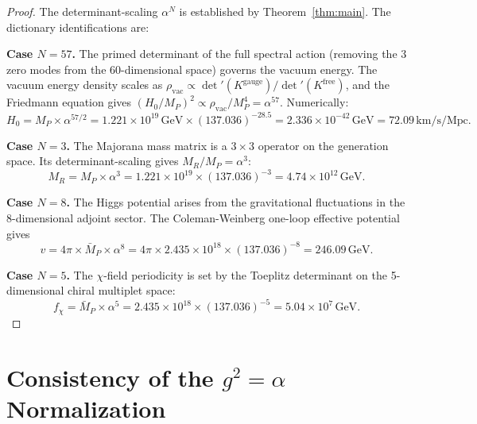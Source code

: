 \documentclass[11pt]{article}
\theoremstyle{definition}
\theoremstyle{remark}
\newcommand{\Mp}{M_P}
\newcommand{\Mpr}{\bar{M}_P}
\begin{document}
\begin{proof}
The determinant-scaling $\alpha^N$ is established by
Theorem~\ref{thm:main}. The dictionary identifications are:

\medskip\noindent
\textbf{Case $N = 57$.} The primed determinant of the full spectral
action (removing the 3 zero modes from the $60$-dimensional space)
governs the vacuum energy. The vacuum energy density scales as
$\rho_{\mathrm{vac}} \propto \det'(K^{\mathrm{gauge}}) /
\det'(K^{\mathrm{free}})$, and the Friedmann equation gives
$(H_0/\Mp)^2 \propto \rho_{\mathrm{vac}}/\Mp^4 = \alpha^{57}$.
Numerically:
\begin{equation}
H_0 = \Mp \times \alpha^{57/2}
= 1.221 \times 10^{19}\,\text{GeV} \times (137.036)^{-28.5}
= 2.336 \times 10^{-42}\,\text{GeV} = 72.09\,\text{km/s/Mpc}.
\end{equation}

\medskip\noindent
\textbf{Case $N = 3$.} The Majorana mass matrix is a $3 \times 3$
operator on the generation space. Its determinant-scaling gives
$M_R / \Mp = \alpha^3$:
\begin{equation}
M_R = \Mp \times \alpha^3 = 1.221 \times 10^{19} \times (137.036)^{-3}
= 4.74 \times 10^{12}\,\text{GeV}.
\end{equation}

\medskip\noindent
\textbf{Case $N = 8$.} The Higgs potential arises from the
gravitational fluctuations in the 8-dimensional adjoint sector.
The Coleman-Weinberg one-loop effective potential gives
\begin{equation}
v = 4\pi \times \Mpr \times \alpha^8
= 4\pi \times 2.435 \times 10^{18} \times (137.036)^{-8}
= 246.09\,\text{GeV}.
\end{equation}

\medskip\noindent
\textbf{Case $N = 5$.} The $\chi$-field periodicity is set by the
Toeplitz determinant on the 5-dimensional chiral multiplet space:
\begin{equation}
f_\chi = \Mpr \times \alpha^5
= 2.435 \times 10^{18} \times (137.036)^{-5}
= 5.04 \times 10^{7}\,\text{GeV}.
\end{equation}
\end{proof}


\section{Consistency of the $g^2 = \alpha$ Normalization}
\label{sec:consistency}
\end{document}
